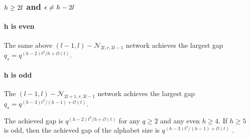 \subsubsection{$h\protect\geq2l$ and $\epsilon\protect\neq h-2l$}

\paragraph{h is even}

The same above $\left(l-1,l\right)-\mathcal{N}_{2l,r,3l-1}$ network
achieves the largest gap $q_{s}=q^{(h-2)t^{2}/h+\mathcal{O}(t)}$.

\paragraph{h is odd}

The $\left(l-1,l\right)-\mathcal{N}_{2l+1,r,3l-1}$ network achieves
the largest gap $q_{s}=q^{(h-3)t^{2}/\left(h-1\right)+\mathcal{O}(t)}$.
\begin{rem}
The achieved gap is $q^{(h-2)t^{2}/h+\mathcal{O}(t)}$ for any $q\geq2$
and any even $h\geq4$. If $h\geq5$ is odd, then the achieved gap
of the alphabet size is $q^{(h-3)t^{2}/\left(h-1\right)+\mathcal{O}(t)}$
\cite{Wachter-Zeh:2018}.
\end{rem}

\clearpage